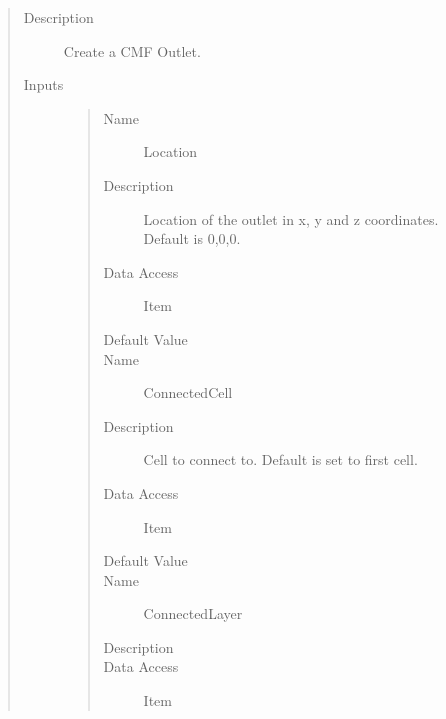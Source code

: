 \documentclass[letterpaper,10pt,english]{sphinxmanual}
\begin{document}
\begin{quote}\begin{description}
\item[{Description}] \leavevmode
Create a CMF Outlet.

\item[{Inputs}] \leavevmode\begin{quote}\begin{description}
\item[{Name}] \leavevmode
Location

\item[{Description}] \leavevmode
Location of the outlet in x, y and z coordinates. Default is 0,0,0.

\item[{Data Access}] \leavevmode
Item

\item[{Default Value}] \leavevmode
\begin{DUlineblock}{0em}
\item[] {[}0, 0, 0{]}
\end{DUlineblock}

\item[{Name}] \leavevmode
ConnectedCell

\item[{Description}] \leavevmode
Cell to connect to. Default is set to first cell.

\item[{Data Access}] \leavevmode
Item

\item[{Default Value}] \leavevmode
{}

\item[{Name}] \leavevmode
ConnectedLayer

\item[{Description}] \leavevmode
{}

\item[{Data Access}] \leavevmode
Item


\end{description}
\end{quote}
\end{description}
\end{quote}
\end{document}

